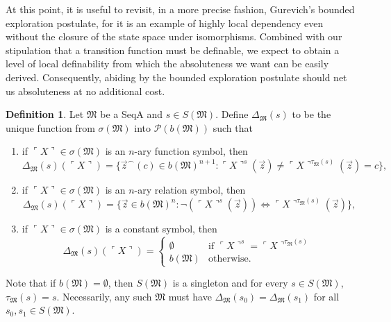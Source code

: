 \documentclass[12pt, twoside]{memoir}
\numberwithin{equation}{section}
\theoremstyle{definition}
\newtheorem{defi}[thm]{Definition}
\theoremstyle{remark}
\theoremstyle{definition}
\theoremstyle{definition}
\theoremstyle{definition}
\theoremstyle{remark}
\begin{document}
At this point, it is useful to revisit, in a more precise fashion, Gurevich's bounded exploration postulate, for it is an example of highly local dependency even without the closure of the state space under isomorphisms. Combined with our stipulation that a transition function must be definable, we expect to obtain a level of local definability from which the absoluteness we want can be easily derived. Consequently, abiding by the bounded exploration postulate should net us absoluteness at no additional cost.

\begin{defi}
Let $\mathfrak{M}$ be a SeqA and $s \in S(\mathfrak{M})$. Define $\Delta_{\mathfrak{M}}(s)$ to be the unique function from $\sigma(\mathfrak{M})$ into $\mathcal{P}(b(\mathfrak{M}))$ such that
\begin{enumerate}[label=(\alph*)]
    \item if $\ulcorner X \urcorner \in \sigma(\mathfrak{M})$ is an $n$-ary function symbol, then 
    \begin{equation*}
        \Delta_{\mathfrak{M}}(s)(\ulcorner X \urcorner) = \{\Vec{z}^{\frown}(c) \in b(\mathfrak{M})^{n + 1} : \ulcorner X \urcorner^{s}(\Vec{z}) \neq \ulcorner X \urcorner^{\tau_{\mathfrak{M}}(s)}(\Vec{z}) = c \} \text{,}
    \end{equation*}
    \item if $\ulcorner X \urcorner \in \sigma(\mathfrak{M})$ is an $n$-ary relation symbol, then 
    \begin{equation*}
        \Delta_{\mathfrak{M}}(s)(\ulcorner X \urcorner) = \{\Vec{z} \in b(\mathfrak{M})^n : \neg (\ulcorner X \urcorner^{s}(\Vec{z})) \iff \ulcorner X \urcorner^{\tau_{\mathfrak{M}}(s)}(\Vec{z})\} \text{,}
    \end{equation*}
    \item if $\ulcorner X \urcorner \in \sigma(\mathfrak{M})$ is a constant symbol, then 
    \begin{equation*}
        \Delta_{\mathfrak{M}}(s)(\ulcorner X \urcorner) =
        \begin{cases}
            \emptyset & \text{if } \ulcorner X \urcorner^{s} = \ulcorner X \urcorner^{\tau_{\mathfrak{M}}(s)} \\
            b(\mathfrak{M}) & \text{otherwise.}
        \end{cases}
    \end{equation*}
\end{enumerate}
Note that if $b(\mathfrak{M}) = \emptyset$, then $S(\mathfrak{M})$ is a singleton and for every $s \in S(\mathfrak{M})$, $\tau_{\mathfrak{M}}(s) = s$. Necessarily, any such $\mathfrak{M}$ must have $\Delta_{\mathfrak{M}}(s_0) = \Delta_{\mathfrak{M}}(s_1)$ for all $s_0, s_1 \in S(\mathfrak{M})$.
\end{defi}
\end{document}
